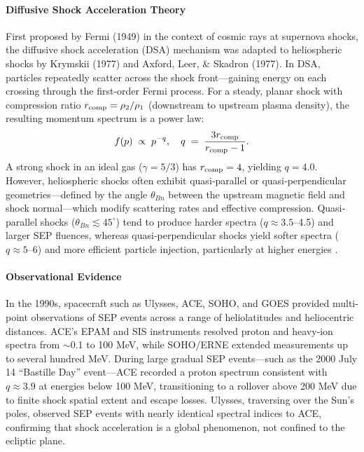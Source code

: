 \documentclass[12pt]{report}
\begin{document}
\paragraph{Diffusive Shock Acceleration Theory}  
First proposed by Fermi (1949) in the context of cosmic rays at supernova shocks, the diffusive shock acceleration (DSA) mechanism was adapted to heliospheric shocks by Krymskii (1977) and Axford, Leer, \& Skadron (1977).  In DSA, particles repeatedly scatter across the shock front—gaining energy on each crossing through the first‐order Fermi process.  For a steady, planar shock with compression ratio $r_{\rm comp} = \rho_2/\rho_1$ (downstream to upstream plasma density), the resulting momentum spectrum is a power law:
\begin{equation}
  f(p) \;\propto\; p^{-q}, 
  \quad
  q \;=\; \frac{3r_{\rm comp}}{r_{\rm comp}-1}.
  \label{eq:dsq}
\end{equation}
A strong shock in an ideal gas ($\gamma=5/3$) has $r_{\rm comp}=4$, yielding $q=4.0$.  However, heliospheric shocks often exhibit quasi‐parallel or quasi‐perpendicular geometries—defined by the angle $\theta_{Bn}$ between the upstream magnetic field and shock normal—which modify scattering rates and effective compression.  Quasi‐parallel shocks ($\theta_{Bn}\lesssim45^\circ$) tend to produce harder spectra ($q\approx3.5$–4.5) and larger SEP fluences, whereas quasi‐perpendicular shocks yield softer spectra ($q\approx5$–6) and more efficient particle injection, particularly at higher energies \cite{reames1999particle}.

\paragraph{Observational Evidence}  
In the 1990s, spacecraft such as Ulysses, ACE, SOHO, and GOES provided multi-point observations of SEP events across a range of heliolatitudes and heliocentric distances.  ACE’s EPAM and SIS instruments resolved proton and heavy‐ion spectra from $\sim$0.1 to 100 MeV, while SOHO/ERNE extended measurements up to several hundred MeV.  During large gradual SEP events—such as the 2000 July 14 “Bastille Day” event—ACE recorded a proton spectrum consistent with $q\approx3.9$ at energies below 100 MeV, transitioning to a rollover above 200 MeV due to finite shock spatial extent and escape losses.  Ulysses, traversing over the Sun’s poles, observed SEP events with nearly identical spectral indices to ACE, confirming that shock acceleration is a global phenomenon, not confined to the ecliptic plane.
\end{document}
